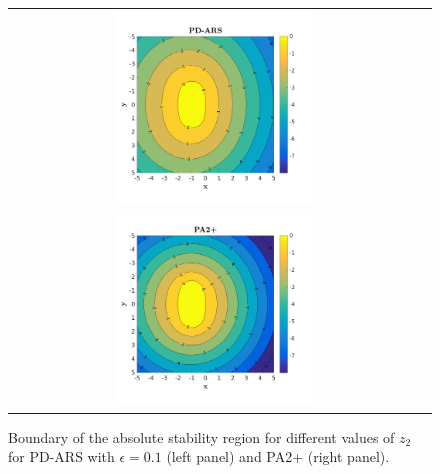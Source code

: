 \begin{figure}[h]
  \centering
  \begin{tabular}{cc}
    \includegraphics[width=0.5\textwidth]{figures/AbsoluteStabilityPARSD}
    \includegraphics[width=0.5\textwidth]{figures/AbsoluteStabilityPA2+}
  \end{tabular}
   \caption{Boundary of the absolute stability region for different values of $z_2$ for PD-ARS with $\epsilon = 0.1$ (left panel) and PA2+ (right panel).}
  \label{fig:AbsoluteStability}
\end{figure}